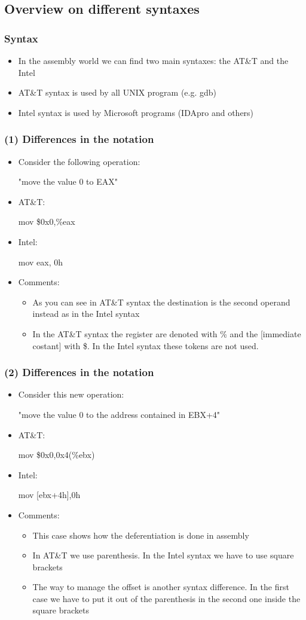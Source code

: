 \documentclass[]{beamer}
\begin{document}
	\subsection{Overview on different syntaxes}
		\begin{frame}
			\frametitle{Syntax}
			\begin{itemize}
				\item{In the assembly world we can find two main syntaxes: the AT\&T and the Intel}
				\item{AT\&T syntax is used by all UNIX program (e.g. gdb)}
				\item{Intel syntax is used by Microsoft programs (IDApro and others)}
			\end{itemize}
		\end{frame}
		\begin{frame}
			\frametitle{(1) Differences in the notation}
			\begin{itemize}
				\item{Consider the following operation:\newline\centerline{"move the value 0 to EAX"}}
				\item{AT\&T: \centerline{ mov \$0x0,\%eax} }
				\item{Intel: \centerline{ mov eax, 0h}}
				\item{Comments:} 
				\begin{itemize}
					\item{As you can see in AT\&T syntax the destination is the second operand instead as in the Intel syntax}
					\item{In the AT\&T syntax the register are denoted with \% and the [immediate \textpipe{} costant] with \$. In the Intel syntax these tokens are not used. }
				\end{itemize}
			\end{itemize}
		\end{frame}
		\begin{frame}
			\frametitle{(2) Differences in the notation}
			\begin{itemize}
				\item{Consider this new operation:\newline\centerline {"move the value 0 to the address contained in EBX+4"}}
				\item{AT\&T: \centerline{ mov \$0x0,0x4(\%ebx)}}
				\item{Intel: \centerline{ mov [ebx+4h],0h }}
				\item{Comments:}
				\begin{itemize}
					\item{This case shows how  the deferentiation is done in assembly}
					\item{In AT\&T we use parenthesis. In the Intel syntax we have to use square brackets}
					\item{The way to manage the offset is another syntax difference. In the first case we have to put it out of the parenthesis in the second one inside the square brackets }
				\end{itemize}
			\end{itemize}
		\end{frame}
\end{document}
